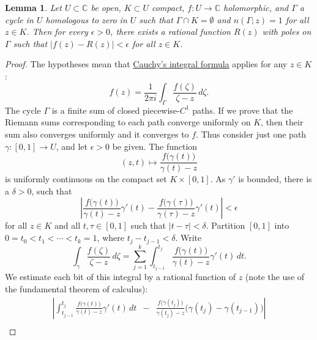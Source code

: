 \documentclass[12pt,openany]{book}
\newcommand{\sabs}[1]{\lvert {#1} \rvert}
\newcommand{\abs}[1]{\left\lvert {#1} \right\rvert}
\newcommand{\C}{{\mathbb{C}}}
\theoremstyle{plain}
\newtheorem{lemma}[thm]{Lemma}
\theoremstyle{remark}
\theoremstyle{definition}
\theoremstyle{exercise}
\theoremstyle{example}
\begin{document}
\begin{lemma} \label{lemma:ratapproxriemann}
Let $U \subset \C$ be open, $K \subset U$ compact, $f \colon U \to \C$
holomorphic, and $\Gamma$ a cycle in $U$ homologous to zero in $U$
such that $\Gamma \cap K = \emptyset$ and $n(\Gamma;z) = 1$ for all $z \in
K$.  Then for every $\epsilon > 0$, there exists a rational function $R(z)$ with
poles on $\Gamma$ such that $\sabs{f(z)-R(z)} < \epsilon$ for all $z \in K$.
\end{lemma}

\begin{proof}
The hypotheses mean that \hyperref[thm:CIFhomology]{Cauchy's integral formula}
applies for any $z \in K$:
\begin{equation*}
f(z) =
\frac{1}{2\pi i}
\int_\Gamma
\frac{f(\zeta)}{\zeta-z} \, d \zeta .
\end{equation*}
The cycle $\Gamma$ is a finite sum of closed piecewise-$C^1$ paths.
If we prove that the Riemann sums corresponding to each path
converge uniformly on $K$, then their sum also converges uniformly
and it converges to $f$.
Thus consider just one path $\gamma \colon [0,1] \to U$, and
let $\epsilon > 0$ be given.
The function
\begin{equation*}
(z,t) \mapsto
\frac{f\bigl(\gamma(t)\bigr)}{\gamma(t)-z}
\end{equation*}
is uniformly continuous on the compact set $K \times [0,1]$.
As $\gamma'$ is bounded, there is a $\delta > 0$, such that
\begin{equation*}
\abs{
\frac{f\bigl(\gamma(t)\bigr)}{\gamma(t)-z}\gamma'(t)
-
\frac{f\bigl(\gamma(\tau)\bigr)}{\gamma(\tau)-z}\gamma'(t)
} < \epsilon
\end{equation*}
for all $z \in K$ and all $t,\tau \in [0,1]$ such that $\sabs{t-\tau} <
\delta$.
Partition $[0,1]$ into $0 = t_0 < t_1 < \cdots < t_k = 1$, where
$t_j-t_{j-1} < \delta$.
Write
\begin{equation*}
\int_\gamma
\frac{f(\zeta)}{\zeta-z} \, d\zeta
=
\sum_{j=1}^k
\int_{t_{j-1}}^{t_j}
\frac{f\bigl(\gamma(t)\bigr)}{\gamma(t)-z}
\gamma'(t)
\, dt .
\end{equation*}
We estimate each bit of this integral by a rational function
of $z$
(note the use of the fundamental theorem of calculus):
\begin{multline*}
\abs{
\int_{t_{j-1}}^{t_j}
\frac{f\bigl(\gamma(t)\bigr)}{\gamma(t)-z}
\gamma'(t)
\, dt
\enspace
-
\enspace
\frac{f\bigl(\gamma(t_j)\bigr)}{\gamma(t_j)-z}
\bigl( \gamma(t_j)-\gamma(t_{j-1}) \bigr)
}
\\

\end{multline*}
\end{proof}
\end{document}

